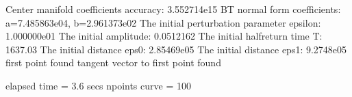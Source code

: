 \documentclass[letterpaper,10pt,english]{jupyterBook}
\begin{document}
\begin{sphinxVerbatim}[commandchars=\\\{\}]
\PYG{p}{[}\PYG{p}{]}
\end{sphinxVerbatim}

\begin{sphinxVerbatim}[commandchars=\\\{\}]
Center manifold coefficients\PYGZsq{} accuracy: 3.552714e\PYGZhy{}15
BT normal form coefficients:
a=\PYGZhy{}7.485863e\PYGZhy{}04,	 b=\PYGZhy{}2.961373e\PYGZhy{}02
The initial perturbation parameter epsilon:  1.000000e\PYGZhy{}01
The initial amplitude: 0.0512162
The initial half\PYGZhy{}return time T: 1637.03
The initial distance eps0: 2.85469e\PYGZhy{}05
The initial distance eps1: 9.2748e\PYGZhy{}05
first point found
tangent vector to first point found

elapsed time  = 3.6 secs
npoints curve = 100
\end{sphinxVerbatim}
\end{document}
